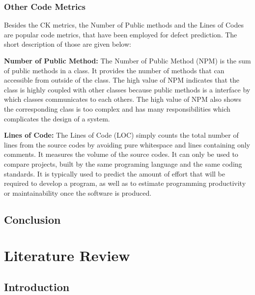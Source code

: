 \documentclass[12pt]{report}
\begin{document}
\subsection{ Other Code Metrics}
Besides the CK metrics, the Number of Public methods and the Lines of Codes are popular code metrics, that have been employed for defect prediction. The short description of those are given below:

\textbf{Number of Public Method:}
The Number of Public Method (NPM) is the sum of public methods in a class. It provides the number of methods that can accessible from outside of the class. The high value of NPM indicates that the class is highly coupled with other classes because public methods is a interface by which classes communicates to each others. The high value of NPM also shows the corresponding class is too complex and has many responsibilities which complicates the design of a system.

\textbf{Lines of Code:}
The Lines of Code (LOC) simply counts the total number of lines from the source codes by avoiding pure whitespace and lines containing only comments. It measures the volume of the source codes. It can only be used to compare projects, built by the same programing language and the same coding standards. It is typically used to predict the amount of effort that will be required to develop a program, as well as to estimate programming productivity or maintainability once the software is produced.


\section{Conclusion}

\chapter{Literature Review}
\section{Introduction}
\end{document}
